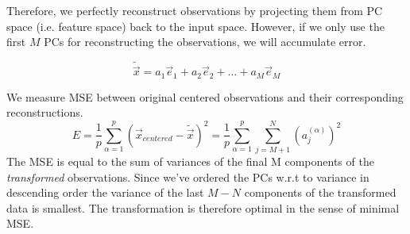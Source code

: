 Therefore, we perfectly reconstruct observations by projecting them from PC space (i.e. feature space) back to the input space. 
However, if we only use the first $M$ PCs for reconstructing the observations, we will accumulate error.

$$
\widetilde{\vec{x}} = a_1 \vec{e}_1 + a_2 \vec{e}_2 + \ldots
		+ a_M \vec{e}_M
$$
		
We measure MSE between original centered observations and their corresponding reconstructions.
$$
E = \frac{1}{p} \sum_{\alpha = 1}^{p} (\vec x_{centered} - \widetilde{\vec{x}})^2 = \frac{1}{p} \sum_{\alpha = 1}^{p} \sum_{j = M+1}^{N} (a_j^{(\alpha)})^2
$$
The MSE is equal to the sum of variances of the final M components of the \emph{transformed} observations. Since we've ordered the PCs w.r.t to variance in descending order the variance of the last $M-N$ components of the transformed data is smallest.
The transformation is therefore optimal in the sense of minimal MSE.


